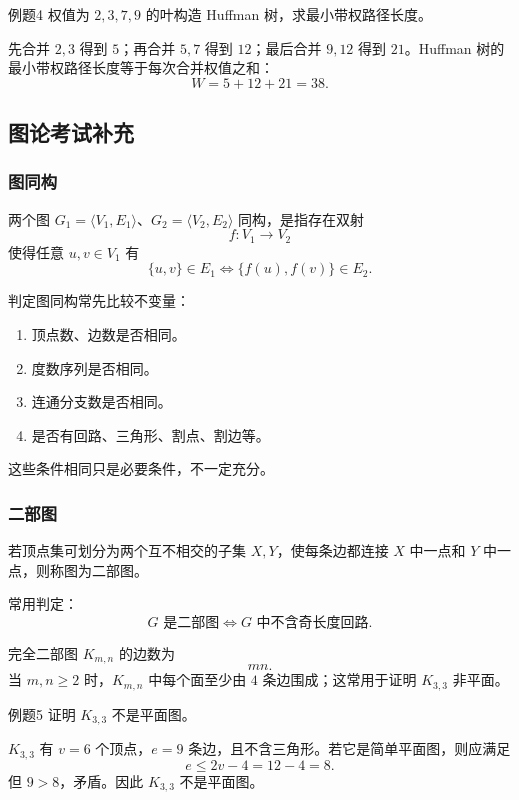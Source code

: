 \begin{question}{例题4}
	权值为 \(2,3,7,9\) 的叶构造 Huffman 树，求最小带权路径长度。
	
	\begin{solution}
	先合并 \(2,3\) 得到 \(5\)；再合并 \(5,7\) 得到 \(12\)；最后合并 \(9,12\) 得到 \(21\)。Huffman 树的最小带权路径长度等于每次合并权值之和：
	\[
	W=5+12+21=38.
	\]
	\end{solution}
\end{question}

\subsection{图论考试补充}

\subsubsection{图同构}

两个图 \(G_1=\langle V_1,E_1\rangle\)、\(G_2=\langle V_2,E_2\rangle\) 同构，是指存在双射
\[
f:V_1\to V_2
\]
使得任意 \(u,v\in V_1\) 有
\[
\{u,v\}\in E_1\Leftrightarrow \{f(u),f(v)\}\in E_2.
\]

判定图同构常先比较不变量：
\begin{enumerate}
	\item 顶点数、边数是否相同。
	\item 度数序列是否相同。
	\item 连通分支数是否相同。
	\item 是否有回路、三角形、割点、割边等。
\end{enumerate}
这些条件相同只是必要条件，不一定充分。

\subsubsection{二部图}

若顶点集可划分为两个互不相交的子集 \(X,Y\)，使每条边都连接 \(X\) 中一点和 \(Y\) 中一点，则称图为二部图。

常用判定：
\[
G\text{ 是二部图}\Leftrightarrow G\text{ 中不含奇长度回路}.
\]

完全二部图 \(K_{m,n}\) 的边数为
\[
mn.
\]
当 \(m,n\ge2\) 时，\(K_{m,n}\) 中每个面至少由 \(4\) 条边围成；这常用于证明 \(K_{3,3}\) 非平面。

\begin{question}{例题5}
	证明 \(K_{3,3}\) 不是平面图。
	
	\begin{solution}
	\(K_{3,3}\) 有 \(v=6\) 个顶点，\(e=9\) 条边，且不含三角形。若它是简单平面图，则应满足
	\[
	e\le2v-4=12-4=8.
	\]
	但 \(9>8\)，矛盾。因此 \(K_{3,3}\) 不是平面图。
	\end{solution}
\end{question}

